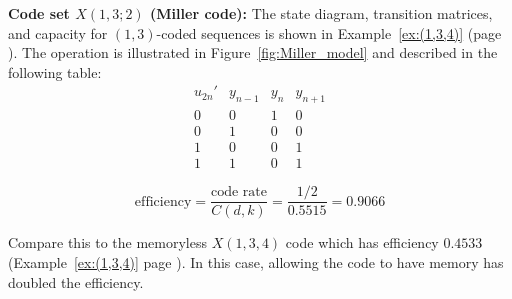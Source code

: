 \begin{example}{\bf Code set $X(1,3;2)$ (Miller code):}
The state diagram, transition matrices, and capacity for 
$(1,3)$-coded sequences is shown in 
Example~\ref{ex:(1,3,4)} (page \pageref{ex:(1,3,4)}).
The operation is illustrated in Figure~\ref{fig:Miller_model} and 
described in the following table:
\[
   \begin{array}{cc|cc}
      u_{2n}' & y_{n-1} & y_n & y_{n+1} \\
      \hline
      0 & 0 & 1 & 0   \\
      0 & 1 & 0 & 0   \\
      1 & 0 & 0 & 1   \\
      1 & 1 & 0 & 1  
   \end{array}
\]

\[
    \mathrm{efficiency} 
    = \frac{\mbox{code rate}}{C(d,k)} 
    = \frac{1/2}{0.5515} 
    = 0.9066
\]
\end{example}

Compare this to the memoryless $X(1,3,4)$ code 
which has efficiency $0.4533$
(Example~\ref{ex:(1,3,4)} page \pageref{ex:(1,3,4)}).
In this case, allowing the code to have memory
has doubled the efficiency.



